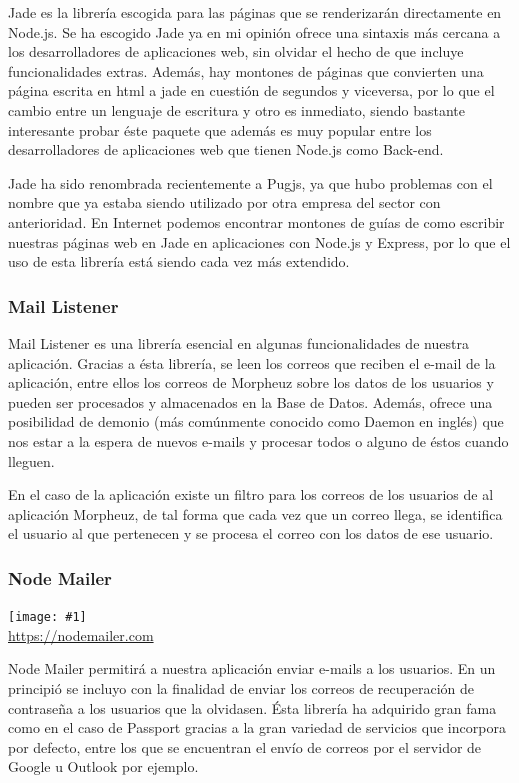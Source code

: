 \documentclass[11pt,openany]{book}
\newcommand{\logo}[2]{\medskip\begin{center}\texttt{[image: \#1]}\\\scriptsize\url{#2}\end{center}\bigskip}
\begin{document}
Jade es la librería escogida para las páginas que se renderizarán directamente en Node.js. Se ha escogido Jade ya en mi opinión ofrece una sintaxis más cercana a los desarrolladores de aplicaciones web, sin olvidar el hecho de que incluye funcionalidades extras. Además, hay montones de páginas que convierten una página escrita en html a jade en cuestión de segundos y viceversa, por lo que el cambio entre un lenguaje de escritura y otro es inmediato, siendo bastante interesante probar éste paquete que además es muy popular entre los desarrolladores de aplicaciones web que tienen Node.js como Back-end.

Jade ha sido renombrada recientemente a Pugjs, ya que hubo problemas con el nombre que ya estaba siendo utilizado por otra empresa del sector con anterioridad. En Internet podemos encontrar montones de guías de como escribir nuestras páginas web en Jade en aplicaciones con Node.js y Express, por lo que el uso de esta librería está siendo cada vez más extendido.

\subsubsection{Mail Listener}

Mail Listener es una librería esencial en algunas funcionalidades de nuestra aplicación. Gracias a ésta librería, se leen los correos que reciben el e-mail de la aplicación, entre ellos los correos de Morpheuz sobre los datos de los usuarios y pueden ser procesados y almacenados en la Base de Datos. Además, ofrece una posibilidad de demonio (más comúnmente conocido como Daemon en inglés) que nos estar a la espera de nuevos e-mails y procesar todos o alguno de éstos cuando lleguen.

En el caso de la aplicación existe un filtro para los correos de los usuarios de al aplicación Morpheuz, de tal forma que cada vez que un correo llega, se identifica el usuario al que pertenecen y se procesa el correo con los datos de ese usuario.

\subsubsection{Node Mailer}

\logo{logos/nodemailer.png}{https://nodemailer.com}

Node Mailer permitirá a nuestra aplicación enviar e-mails a los usuarios. En un principió se incluyo con la finalidad de enviar los correos de recuperación de contraseña a los usuarios que la olvidasen. Ésta librería ha adquirido gran fama como en el caso de Passport gracias a la gran variedad de servicios que incorpora por defecto, entre los que se encuentran el envío de correos por el servidor de Google u Outlook por ejemplo.
\end{document}
